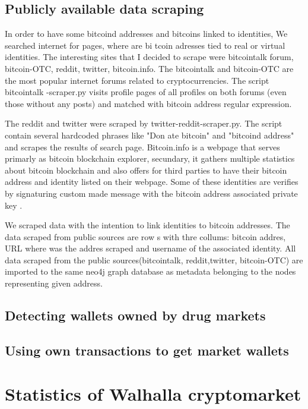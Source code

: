 \documentclass[
  digital, %
  table,   %
  lof,     %
  lot,     %
  oneside
]{fithesis3}
\begin{document}
\section{Publicly available data scraping}
In order to have some bitcoind addresses and bitcoins linked to identities, We searched internet for pages, where are bi
tcoin adresses tied to real or virtual identities.
The interesting sites that I decided to scrape were bitcointalk forum, bitcoin-OTC, reddit, twitter, bitcoin.info.
The bitcointalk and bitcoin-OTC are the most popular internet forums related to cryptocurrencies. The script bitcointalk
-scraper.py visits profile pages of all profiles on both forums (even those without any posts)
 and matched with bitcoin address regular expression.
 
The reddit and twitter were scraped by twitter-reddit-scraper.py. The script contain several hardcoded phrases like "Don
ate bitcoin" and "bitcoind address" and scrapes the results of search page.
Bitcoin.info is a webpage that serves primarly as bitcoin blockchain explorer, secundary,
it gathers multiple statistics about bitcoin blockchain and also offers for third parties to have their bitcoin address 
and identity listed on their webpage.
Some of these identities are verifies by signaturing custom made message with the bitcoin address associated private key
.

We scraped data with the intention to link identities to bitcoin addresses. The data scraped from public sources are row
s with thre collums: bitcoin addres, URL where was the addres scraped and username of the associated identity.
All data scraped from the public sources(bitcointalk, reddit,twitter, bitcoin-OTC) are imported to the same neo4j graph 
database as metadata belonging to the nodes representing given address.

\section{Detecting wallets owned by drug markets}
\section{Using own transactions to get market wallets}

\chapter{Statistics of Walhalla cryptomarket}
\end{document}
